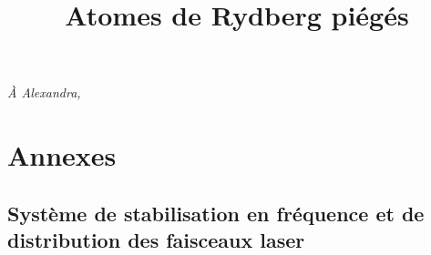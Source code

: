 \documentclass[11pt,a4paper,twoside]{book}
\title{Atomes de Rydberg piégés}
\renewcommand{\chaptermark}[1]{\markboth{Chapitre {\thechapter}. #1}{}}
\renewcommand \thechapter{\Roman{chapter}}
\begin{document}
\frontmatter
{}
\thispagestyle{empty}
\vspace*{0.2\textheight}
\begin{flushright}
\emph{\`A Alexandra,}
\end{flushright}
\vspace*{\fill}\clearpage
\makeatletter
\let\ps@plain\ps@empty

\makeatother

\dominitoc
\tableofcontents
\thispagestyle{fancyplain}
\listoffigures \mtcaddchapter
\listoftables \mtcaddchapter
\thispagestyle{fancyplain}
\mainmatter
{}

%
%
%
%
%
%
%
%
%
%
%
%
%




\part*{Annexes}
\appendix
\renewcommand{\chaptermark}[1]{\markboth{\appendixname\ \thechapter: #1}{}}

\chapter{Système de stabilisation en fréquence et de distribution des faisceaux laser}\label{app:laserlock}
\end{document}
